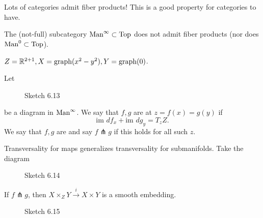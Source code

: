 Lots of categories admit fiber products! This is a good property for categories to have. 

 The (not-full) subcategory \(\text{Man}^\infty\subset\text{Top}\) does not admit 
fiber products (nor does \(\man0\subset\text{Top}\)). 
\begin{example}
    \(Z=\mathbb{R}^{2+1},X=\text{graph}(x^2-y^2),Y=\text{graph(0)}\).
\end{example} 

\begin{definition*}
    Let \begin{figure}[H]\label{fig:6.13}
        \centering
        \caption{Sketch 6.13}
    \end{figure}
    be a diagram in \(\text{Man}^\infty\). We say that \(f,g\) are  at \(z=f(x)=g(y)\) if 
    \[\text{im }df_x+\text{im }dg_y=T_zZ.\]
    We say that \(f,g\) are  and say \(f\pitchfork g\) if this holds 
    for all such \(z\).
\end{definition*}

\begin{remark}
    Transversality for maps generalizes transversality for submanifolds. Take the diagram 
    \begin{figure}[H]\label{fig:6.14}
        \centering
        \caption{Sketch 6.14}
    \end{figure}
\end{remark}

\begin{proposition}\label{prop:6.2}
    If \(f\pitchfork g\), then \(X\times_Z Y \stackrel{i}{\to} X\times Y\) is a smooth embedding.
\end{proposition}
\begin{figure}[H]\label{fig:6.15}
    \centering
    \caption{Sketch 6.15}
\end{figure}

